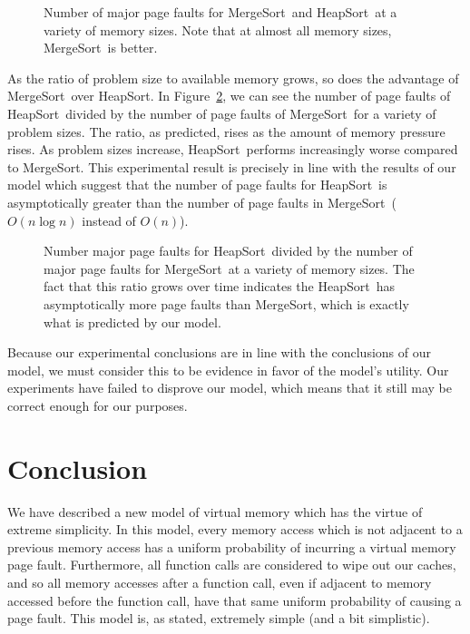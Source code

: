 \documentclass[11pt]{article}
\newcommand{\heapsort}{{\sc HeapSort}}
\newcommand{\mergesort}{{\sc MergeSort}}
\begin{document}
\begin{figure}

\caption{Number of major page faults for \mergesort\ and \heapsort\ at a variety of memory sizes.  Note that at almost all memory sizes, \mergesort\ is better.}
\label{fig:sizes}
\end{figure}

As the ratio of problem size to available memory grows, so does the advantage
of \mergesort\ over \heapsort.  In Figure~\ref{fig:ratio}, we can see the
number of page faults of \heapsort\ divided by the number of page faults of
\mergesort\ for a variety of problem sizes.  The ratio, as predicted, rises as
the amount of memory pressure rises.  As problem sizes increase, \heapsort\
performs increasingly worse compared to \mergesort. This experimental result is
precisely in line with the results of our model which suggest that the number of page faults for \heapsort\ is asymptotically greater than the number of page faults in \mergesort\ ($O(n \log n)$ instead of $O(n)$).

\begin{figure}

\caption{Number major page faults for \heapsort\ divided by the number of major page faults for \mergesort\ at a variety of memory sizes.  The fact that this ratio grows over time indicates the \heapsort\ has asymptotically more page faults than \mergesort, which is exactly what is predicted by our model.}
\label{fig:ratio}
\end{figure}

Because our experimental conclusions are in line with the conclusions of our
model, we must consider this to be evidence in favor of the model's utility.
Our experiments have failed to disprove our model, which means that it still
may be correct enough for our purposes.

\section{Conclusion}

We have described a new model of virtual memory which has the virtue of extreme
simplicity.  In this model, every memory access which is not adjacent to a previous memory access has a uniform probability of incurring a virtual memory page fault.  Furthermore, all function calls are considered to wipe out our caches, and so all memory accesses after a function call, even if adjacent to memory accessed before the function call, have that same uniform probability of causing a page fault.  This model is, as stated, extremely simple (and a bit simplistic).
\end{document}
